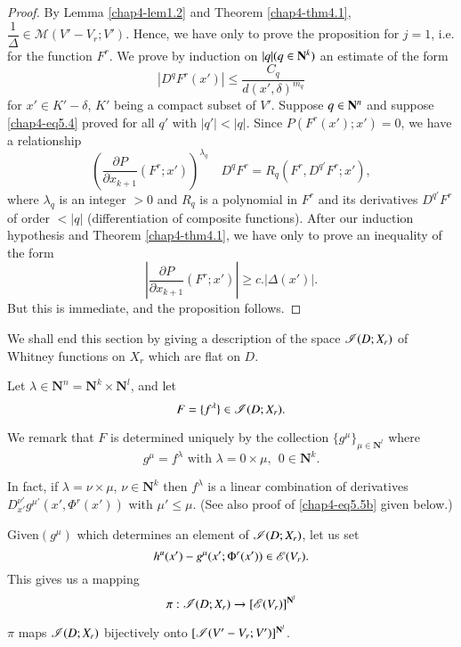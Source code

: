 \begin{proof}
  By Lemma \ref{chap4-lem1.2} and Theorem \ref{chap4-thm4.1}, $\dfrac{1}{\Delta} \in \mathscr{M} (V'-V_r; V')$. Hence, we have only to prove the proposition for $j=1$, i.e. for the function $F^r$. We prove by induction on $|q| (q\in \mathbf{N}^k)$ an estimate of the form
   \begin{equation*}
|D^q F^r (x')| \leq  \frac{C_q }{d (x', \delta)^{m_q}}  \tag{5.4}\label{chap4-eq5.4}
  \end{equation*}
   for $x' \in K' - \delta$, $K'$ being a compact subset of $V'$. Suppose $q \in \mathbf{N}^n$ and suppose \eqref{chap4-eq5.4} proved for all $q'$ with $|q'|<|q|$. Since $P(F^r (x'); x') =0$, we have a relationship
   $$
\left(\frac{\partial P}{\partial x_{k+1}} (F^r; x') \right)^{\lambda_q} \quad D^q F^r = R_q (F^r, D^{q'} F^r; x'),
$$
where $\lambda_q$ is an integer $> 0$ and $R_q$ is a polynomial in $F^r$ and its derivatives $D^{q'} F^r$  of order $<|q|$ (differentiation of composite functions). After our induction hypothesis and Theorem \ref{chap4-thm4.1}, we have only to prove an inequality of the form
$$
\left|\frac{\partial P}{\partial x_{k+1}} (F^r; x') \right| \geq c. |\Delta (x')|.
$$
But this is immediate, and the proposition follows.
\end{proof}

We shall end this section by giving a description of the space $\mathscr{I} (D; X_r)$ of Whitney functions on $X_r$ which are flat on $D$. 

Let $\lambda \in \mathbf{N}^n = \mathbf{N}^k \times \mathbf{N}^l$, and let
$$
F = \{f^\lambda\} \in \mathscr{I} (D; X_r).
$$

We remark that $F$ is determined uniquely by the collection $\{g^\mu\}_{\mu \in \mathbf{N}^l}$ where 
$$
g^\mu = f^\lambda \text{ with } \lambda = 0 \times \mu, ~~ 0 \in \mathbf{N}^k.
$$

In fact, if $\lambda = \nu \times \mu$, $\nu \in \mathbf{N}^k$ then $f^\lambda$ is a linear combination of derivatives $D^{\nu'}_{x'} g^{\mu'} (x', \Phi^r (x'))$ with $\mu' \leq \mu$. (See also proof of \eqref{chap4-eq5.5b} given below.)

Given\pageoriginale $(g^\mu)$ which determines an element of $\mathscr{I}(D;X_r)$, let us set
$$
h^u (x') - g^\mu (x' ;\Phi^r (x')) \in \mathscr{E} (V_r).
$$
This gives us a mapping
$$
\pi : \mathscr{I} (D ; X_r) \to [\mathscr{E} (V_r)]^{\mathbf{N}^l}
$$

\setcounter{theorem}{4}
\begin{proposition}\label{chap4-prop5.5}
$\pi$ maps $\mathscr{I} (D; X_r)$ bijectively onto $[\mathscr{I} (V' - V_r; V')]^{\mathbf{N}^l}$.
\end{proposition}


